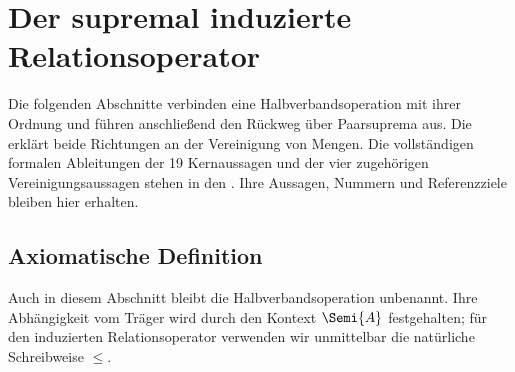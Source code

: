 \documentclass[main.tex]{subfiles}
\begin{document}
\section{Der supremal induzierte Relationsoperator}

\hypertarget{semilattice.main}{}
Die folgenden Abschnitte verbinden eine Halbverbandsoperation mit ihrer
Ordnung und führen anschließend den Rückweg über Paarsuprema aus.
Die \SemilatticeReadingLink{} erklärt beide Richtungen an der Vereinigung
von Mengen. Die vollständigen formalen Ableitungen der 19 Kernaussagen
und der vier zugehörigen Vereinigungsaussagen stehen in den
\SemilatticeProofsLink{}. Ihre Aussagen, Nummern und Referenzziele
bleiben hier erhalten.


\subsection{Axiomatische Definition}

Auch in diesem Abschnitt bleibt die Halbverbandsoperation unbenannt. Ihre
Abhängigkeit vom Träger wird durch den Kontext \(\Semi{A}\) festgehalten; für
den induzierten Relationsoperator verwenden wir unmittelbar die natürliche
Schreibweise \(\leq\).



\end{document}
